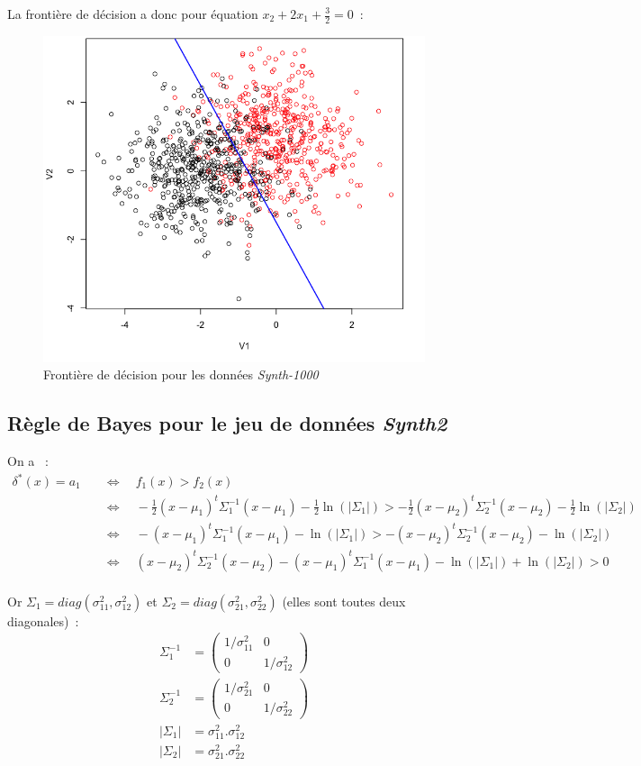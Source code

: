\documentclass[a4paper,10pt]{report}
\begin{document}
La frontière de décision a donc pour équation $x_2 + 2x_1 +\frac{3}{2} = 0$~:
\begin{figure}[H]
	\centering
	\captionsetup{justification=centering, margin=4cm}
	\includegraphics[width=.5\linewidth]{img/3-2-1-front-dec-euc-Synth1}
	\caption{\small Frontière de décision pour les données \textit{Synth-1000}}	
	\label{fig:3-2-1-front-dec-euc-Synth1}%
\end{figure}


\subsection{Règle de Bayes pour le jeu de données \textit{Synth2}}

On a ~:
\begin{align*}
\delta^*(x) = a_1 \quad 
&\Leftrightarrow \quad f_1(x) > f_2(x) \\
&\Leftrightarrow \quad -\frac{1}{2} (x - \mu_1)^t \Sigma_1^{-1} (x - \mu_1) - \frac{1}{2}\ln(|\Sigma_1|) > -\frac{1}{2} (x - \mu_2)^t \Sigma_2^{-1} (x - \mu_2)  -\frac{1}{2} \ln(|\Sigma_2|) \\
&\Leftrightarrow \quad - (x - \mu_1)^t \Sigma_1^{-1} (x - \mu_1) - \ln(|\Sigma_1|) > - (x - \mu_2)^t \Sigma_2^{-1} (x - \mu_2)  - \ln(|\Sigma_2|) \\
&\Leftrightarrow \quad (x - \mu_2)^t \Sigma_2^{-1} (x - \mu_2) - (x - \mu_1)^t \Sigma_1^{-1} (x - \mu_1) - \ln(|\Sigma_1|) + \ln(|\Sigma_2|) > 0 \\
\end{align*}

Or $\Sigma_{1} = diag(\sigma_{11}^2, \sigma_{12}^2)$ et $\Sigma_{2} = diag(\sigma_{21}^2, \sigma_{22}^2)$ (elles sont toutes deux diagonales)~:
\begin{align*}
\Sigma_{1}^{-1} &= \begin{pmatrix} 1/\sigma_{11}^2 & 0 \\ 0 & 1/\sigma_{12}^2 \end{pmatrix} \\
\Sigma_{2}^{-1} &= \begin{pmatrix} 1/\sigma_{21}^2 & 0 \\ 0 & 1/\sigma_{22}^2 \end{pmatrix} \\
|\Sigma_1| &= \sigma_{11}^2 . \sigma_{12}^2  \\
|\Sigma_2| &= \sigma_{21}^2 . \sigma_{22}^2  \\
\end{align*}
\end{document}
